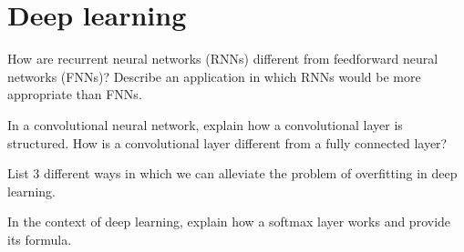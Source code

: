 \documentclass[11pt]{article}
\newcounter{marks}
\begin{document}
\section*{Deep learning}
\begin{list}{{\bf Question 4.:}}
	{
	}

\item
{}
\addtocounter{marks}{1}
How are recurrent neural networks (RNNs) different from feedforward neural networks (FNNs)? Describe an application in which RNNs would be more appropriate than FNNs.

\item
{}
\addtocounter{marks}{1}
In a convolutional neural network, explain how a convolutional layer is structured. How is a convolutional layer different from a fully connected layer?

\item
{}
\addtocounter{marks}{1}
List 3 different ways in which we can alleviate the problem of overfitting in deep learning.

\item
{}
\addtocounter{marks}{1}
In the context of deep learning, explain how a softmax layer works and provide its formula.

\end{list}
\end{document}
